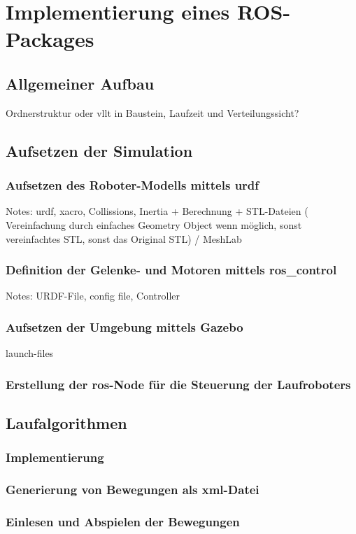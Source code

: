 \chapter{Implementierung eines ROS-Packages}

\section{Allgemeiner Aufbau}

Ordnerstruktur oder vllt in Baustein, Laufzeit und Verteilungssicht?

\section{Aufsetzen der Simulation}

\subsection{Aufsetzen des Roboter-Modells mittels urdf}

Notes: urdf, xacro, Collissions, Inertia + Berechnung + STL-Dateien ( Vereinfachung durch einfaches Geometry Object wenn möglich, sonst vereinfachtes STL, sonst das Original STL) / MeshLab

\subsection{Definition der Gelenke- und Motoren mittels ros\_control}

Notes: URDF-File, config file, Controller

\subsection{Aufsetzen der Umgebung mittels Gazebo}

launch-files

\subsection{Erstellung der ros-Node für die Steuerung der Laufroboters}

\section{Laufalgorithmen}

\subsection{Implementierung}
\subsection{Generierung von Bewegungen als xml-Datei}
\subsection{Einlesen und Abspielen der Bewegungen}
